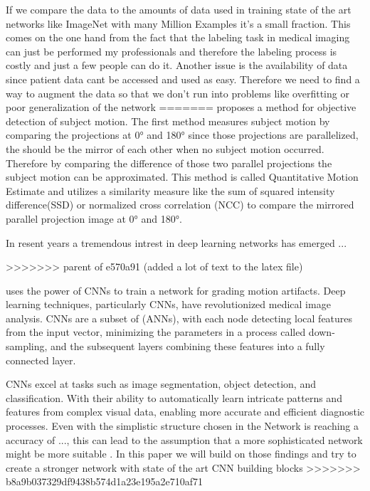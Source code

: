 \documentclass[
a4paper, 
12pt,
grayscalebody, %
abstract=on,
twoside, BCOR10mm, 12pt, DIV13,headinclude, footexclude, final, abstracton, openright
]{ibireprt}
\numberwithin{equation}{chapter}
\numberwithin{table}{chapter}
\numberwithin{figure}{chapter}
\numberwithin{algorithm}{chapter}
\numberwithin{example}{chapter}
\numberwithin{example}{chapter}
\begin{document}
 If we compare the data to the amounts of data used in training state of the art networks like ImageNet with many Million Examples it's a small fraction. This comes on the one hand from the fact that the labeling task in medical imaging can just be performed my professionals and therefore the labeling process is costly and just a few people can do it. Another issue is the availability of data since patient data cant be accessed and used as easy. Therefore we need to find a way to augment the data so that we don't run into problems like overfitting or poor generalization of the network 
=======
\cite{Walle2023} proposes a method for objective detection of subject motion. The first method measures subject motion by comparing the projections at 0° and 180° since those projections are parallelized, the should be the mirror of each other when no subject motion occurred. Therefore by comparing the difference of those two parallel projections the subject motion can be approximated. This method is called Quantitative Motion Estimate and utilizes a similarity measure like the sum of squared intensity difference(SSD) or normalized cross correlation (NCC) to compare the mirrored parallel projection image at 0° and 180°.

In resent years a tremendous intrest in deep learning networks has emerged \cite{LeCun2015} ...\cite{Yamashita2018} %
 
>>>>>>> parent of e570a91 (added a lot of text to the latex file)
  

\cite{Sode2011} uses the power of CNNs to train a network for grading motion artifacts. Deep learning techniques, particularly CNNs, have revolutionized medical image analysis. CNNs are a subset of (ANNs), with each node detecting local features from the input vector, minimizing the parameters in a process called down-sampling, and the subsequent layers combining these features into a fully connected layer.%

CNNs excel at tasks such as image segmentation, object detection, and classification. With their ability to automatically learn intricate patterns and features from complex visual data, enabling more accurate and efficient diagnostic processes. %
Even with the simplistic structure chosen in \cite{Sode2011} the Network is reaching a accuracy of ..., this can lead to the assumption that a more sophisticated network might be more suitable . In this paper we will build on those findings and try to create a stronger network with state of the art CNN building blocks 
>>>>>>> b8a9b037329df9438b574d1a23e195a2e710af71
\end{document}
